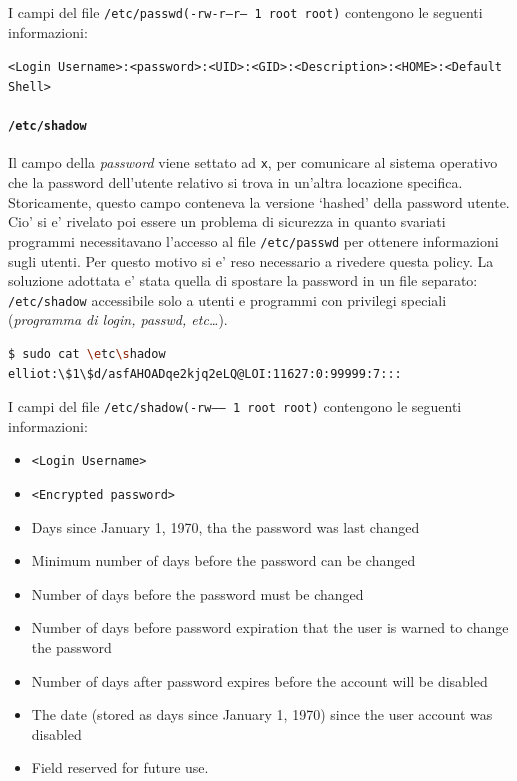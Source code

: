 I campi del file \texttt{/etc/passwd}\texttt{(-rw-r--r-- 1 root root)} contengono le seguenti informazioni:
\begin{center}
	\texttt{<Login Username>:<password>:<UID>:<GID>:<Description>:<HOME>:<Default Shell>}
\end{center}

\paragraph{\texttt{/etc/shadow}}
Il campo della \emph{password} viene settato ad \texttt{x}, per comunicare al sistema operativo che la password dell'utente relativo si trova in un'altra locazione specifica. Storicamente, questo campo conteneva la versione `hashed' della password utente. Cio' si e' rivelato poi essere un problema di sicurezza in quanto svariati programmi necessitavano l'accesso al file \texttt{/etc/passwd} per ottenere informazioni sugli utenti. Per questo motivo si e' reso necessario a rivedere questa policy. La soluzione adottata e' stata quella di spostare la password in un file separato: \texttt{/etc/shadow} accessibile solo a utenti e programmi con privilegi speciali (\emph{programma di login, passwd, etc\dots}).

\begin{lstlisting}[language=bash,basicstyle=\ttfamily,frame=single,caption={Struttura di un file /etc/shadow},captionpos=b]
$ sudo cat \etc\shadow
elliot:\$1\$d/asfAHOADqe2kjq2eLQ@LOI:11627:0:99999:7:::
\end{lstlisting}

I campi del file \texttt{/etc/shadow}\texttt{(-rw------ 1 root root)} contengono le seguenti informazioni:
\begin{itemize}
	\item \texttt{<Login Username>}
	\item \texttt{<Encrypted password>}
	\item Days since January 1, 1970, tha the password was last changed
	\item Minimum number of days before the password can be changed
	\item Number of days before the password must be changed
	\item Number of days before password expiration that the user is warned to change the password
	\item Number of days after password expires before the account will be disabled
	\item The date (stored as days since January 1, 1970) since the user account was disabled
	\item Field reserved for future use.
\end{itemize}

